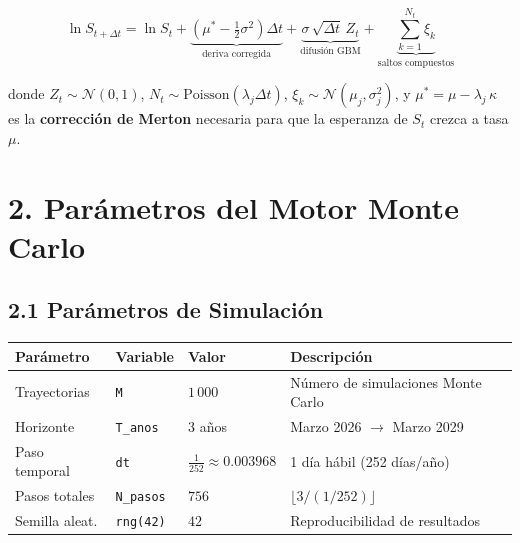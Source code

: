 \documentclass[11pt,letterpaper]{article}
\begin{document}
\begin{equation}
    \ln S_{t+\Delta t} = \ln S_t +
    \underbrace{\left(\mu^* - \tfrac{1}{2}\sigma^2\right)\Delta t}_{\text{deriva corregida}} +
    \underbrace{\sigma\,\sqrt{\Delta t}\,Z_t}_{\text{difusión GBM}} +
    \underbrace{\sum_{k=1}^{N_t}\xi_k}_{\text{saltos compuestos}}
    \label{eq:discretizacion}
\end{equation}

donde $Z_t \sim \mathcal{N}(0,1)$, $N_t \sim \text{Poisson}(\lambda_j \Delta t)$,
$\xi_k \sim \mathcal{N}(\mu_j,\sigma_j^2)$, y $\mu^* = \mu - \lambda_j\,\kappa$
es la \textbf{corrección de Merton} necesaria para que la esperanza de $S_t$
crezca a tasa $\mu$.

\section*{2. Parámetros del Motor Monte Carlo}

\subsection*{2.1 Parámetros de Simulación}

\begin{center}
\begin{tcolorbox}[colback=lightgray, colframe=anahuac, title=Configuración del Motor Monte Carlo, fonttitle=\bfseries\color{white}]
\begin{tabular}{@{}llll@{}}
\toprule
\textbf{Parámetro} & \textbf{Variable} & \textbf{Valor} & \textbf{Descripción} \\
\midrule
Trayectorias   & \texttt{M}        & $1\,000$                   & Número de simulaciones Monte Carlo \\
Horizonte      & \texttt{T\_anos}  & $3$ años                   & Marzo 2026 $\to$ Marzo 2029 \\
Paso temporal  & \texttt{dt}       & $\tfrac{1}{252} \approx 0.003968$ & 1 día hábil (252 días/año) \\
Pasos totales  & \texttt{N\_pasos} & $756$                      & $\lfloor 3 / (1/252) \rfloor$ \\
Semilla aleat. & \texttt{rng(42)}  & $42$                       & Reproducibilidad de resultados \\
\bottomrule
\end{tabular}
\end{tcolorbox}
\end{center}
\end{document}
